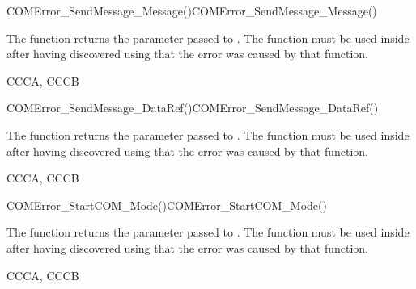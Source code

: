 \begin{function_nopb2}{COMError\_SendMessage\_Message()}{COMError_SendMessage_Message()}
  \begin{fundescription}
    The function returns the  parameter passed to
    . The function must be used inside  
     after having discovered using  that the error 
     was caused by that function.
  \end{fundescription}
  \begin{funreturn}
  \end{funreturn}
  \begin{funconformance}
   CCCA, CCCB
  \end{funconformance}
\end{function_nopb2}

\begin{function_nopb2}{COMError\_SendMessage\_DataRef()}{COMError_SendMessage_DataRef()}
  \begin{fundescription}
    The function returns the  parameter passed to
    . The function must be used inside  
     after having discovered using  that the error 
     was caused by that function.
  \end{fundescription}
  \begin{funreturn}
  \end{funreturn}
  \begin{funconformance}
   CCCA, CCCB
  \end{funconformance}
\end{function_nopb2}

\begin{function_nopb2}{COMError\_StartCOM\_Mode()}{COMError_StartCOM_Mode()}
  \begin{fundescription}
    The function returns the  parameter passed to
    . The function must be used inside
     after having discovered using
     that the error was caused by that
    function.
  \end{fundescription}
  \begin{funreturn}
  \end{funreturn}
  \begin{funconformance}
   CCCA, CCCB
  \end{funconformance}
\end{function_nopb2}

